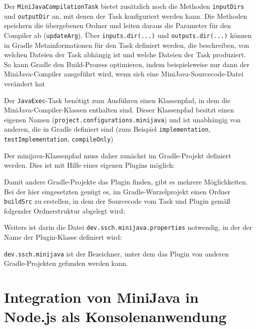 

Der \lstinline{MiniJavaCompilationTask} bietet zusätzlich noch die Methoden \lstinline{inputDirs} und \lstinline{outputDir} an, mit denen der Task konfiguriert werden kann. Die Methoden speichern die übergebenen Ordner und leiten daraus die Parameter für den Compiler ab (\lstinline{updateArg}). Über \lstinline{inputs.dir(...)} und \lstinline{outputs.dir(...)} können in Gradle Metainformationen für den Task definiert werden, die beschreiben, von welchen Dateien der Task abhängig ist und welche Dateien der Task produziert. So kann Gradle den Build-Prozess optimieren, indem beispielsweise nur dann der MiniJava-Compiler ausgeführt wird, wenn sich eine MiniJava-Sourcecode-Datei verändert hat

Der \lstinline{JavaExec}-Task benötigt zum Ausführen einen Klassenpfad, in dem die MiniJava-Compiler-Klassen enthalten sind. Dieser Klassenpfad besitzt einen eigenen Namen (\lstinline{project.configurations.minijava}) und ist unabhängig von anderen, die in Gradle definiert sind (zum Beispiel \lstinline{implementation}, \lstinline{testImplementation}, \lstinline{compileOnly})

Der minijava-Klassenpfad muss daher zunächst im Gradle-Projekt definiert werden. Dies ist mit Hilfe eines eigenen Plugins möglich:



Damit andere Gradle-Projekte das Plugin finden, gibt es mehrere Möglichkeiten. Bei der hier eingesetzten genügt es, im Gradle-Wurzelprojekt einen Ordner \lstinline{buildSrc} zu erstellen, in dem der Sourcecode vom Task und Plugin gemäß folgender Ordnerstruktur abgelegt wird:



Weiters ist darin die Datei \lstinline{dev.ssch.minijava.properties} notwendig, in der der Name der Plugin-Klasse definiert wird:



\lstinline{dev.ssch.minijava} ist der Bezeichner, unter dem das Plugin von anderen Gradle-Projekten gefunden werden kann.

\section{Integration von MiniJava in Node.js als Konsolenanwendung}

